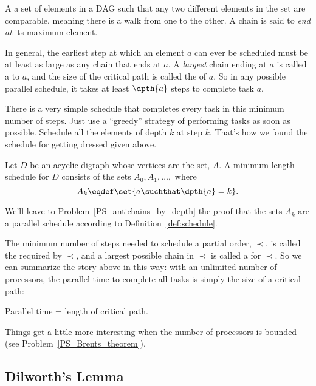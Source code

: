 \begin{definition}
\begin{definition}
A  a set of elements in a DAG such that any two different
elements in the set are comparable, meaning there is a walk from one
to the other.  A chain is said to \emph{end at}
its maximum element.
\end{definition}
\fi

In general, the earliest step at which an element $a$ can ever be
scheduled must be at least as large as any chain that ends at $a$.  A
\emph{largest} chain ending at $a$ is called a  to
$a$, and the size of the critical path is called the  of
$a$.  So in any possible parallel schedule, it takes at least
$\dpth{a}$ steps to complete task $a$.

There is a very simple schedule that completes every task in this
minimum number of steps.  Just use a ``greedy'' strategy of performing
tasks as soon as possible.  Schedule all the elements of depth
$k$ at step $k$.  That's how we found the schedule for getting dressed
given above.

\begin{theorem}\label{thm:parallel-time}
Let $D$ be an acyclic digraph whose vertices are the set, $A$.  A minimum length
schedule for $D$ consists of the sets $A_0, A_1,\dots,$ where
\[
A_k \eqdef \set{a \suchthat \dpth{a} =k}.
\]
\end{theorem}

We'll leave to Problem~\ref{PS_antichains_by_depth} the proof that the
sets $A_k$ are a parallel schedule according to
Definition~\ref{def:schedule}.

The minimum number of steps needed to schedule a partial order,
$\prec$, is called the  required by $\prec$, and a
largest possible chain in $\prec$ is called a  for
$\prec$.  So we can summarize the story above in this way: with an
unlimited number of processors, the parallel time to complete
all tasks is simply the size of a critical path:

\begin{corollary}\label{cor:critical-path-time}
Parallel time = length of critical path.
\end{corollary}

Things get a little more interesting when the number of processors is
bounded (see Problem~\ref{PS_Brents_theorem}).

\subsection{Dilworth's Lemma}\label{dilworth_subsec}


\end{definition}
